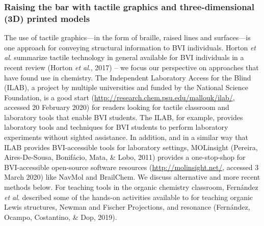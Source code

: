 \documentclass[11.5pt]{sig-alternate} %
\begin{document}
\begin{large}
\subsubsection*{Raising the bar with tactile graphics and three-dimensional (3D) printed models}

The use of tactile graphics—in the form of braille, raised lines and surfaces—is one approach for conveying structural information to BVI individuals. Horton \textit{et al}. summarize tactile technology in general available for BVI individuals in a recent review (Horton \textit{et al}., 2017) – we focus our perspective on approaches that have found use in chemistry. The Independent Laboratory Access for the Blind (ILAB), a project by multiple universities and funded by the National Science Foundation, is a good start (\url{http://research.chem.psu.edu/mallouk/ilab/}, accessed 20 February 2020) for readers looking for tactile classroom and laboratory tools that enable BVI students. The ILAB, for example, provides laboratory tools and techniques for BVI students to perform laboratory experiments without sighted assistance. In addition, and in a similar way that ILAB provides BVI-accessible tools for laboratory settings, MOLinsight (Pereira, Aires-De-Sousa, Bonifácio, Mata, \& Lobo, 2011) provides a one-stop-shop for BVI-accessible open-source software resources (\url{http://molinsight.net/}, accessed 3 March 2020) like NavMol and BrailChem. We discuss alternative and more recent methods below. For teaching tools in the organic chemistry classroom, Fernández \textit{et al}. described some of the hands-on activities available to for teaching organic Lewis structures, Newman and Fischer Projections, and resonance (Fernández, Ocampo, Costantino, \& Dop, 2019).


\end{large}
\end{document}
